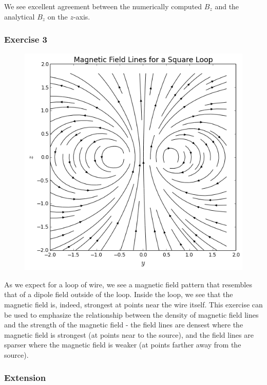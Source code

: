 \documentclass[]{article}
\begin{document}
We see excellent agreement between the numerically computed \(B_z\) and
the analytical \(B_z\) on the \(z\)-axis.

\subsubsection{Exercise 3}\label{exercise-3}

\begin{figure}[htbp]
\centering
\includegraphics{images/output_15_2.png}
\caption{}
\end{figure}

As we expect for a loop of wire, we see a magnetic field pattern that
resembles that of a dipole field outside of the loop. Inside the loop,
we see that the magnetic field is, indeed, strongest at points near the
wire itself. This exercise can be used to emphasize the relationship
between the density of magnetic field lines and the strength of the
magnetic field - the field lines are densest where the magnetic field is
strongest (at points near to the source), and the field lines are
sparser where the magnetic field is weaker (at points farther away from
the source).

\subsubsection{Extension}\label{extension}
\end{document}
